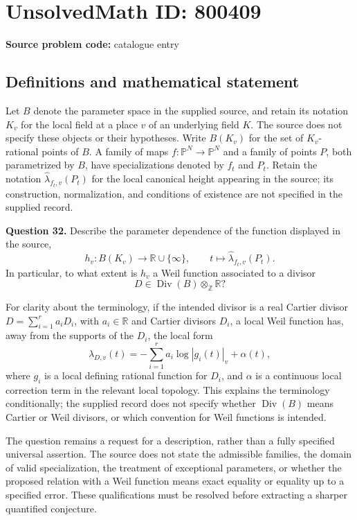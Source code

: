 \documentclass[11pt]{article}
\newcommand{\Z}{\mathbb{Z}}
\newcommand{\R}{\mathbb{R}}
\newcommand{\PP}{\mathbb{P}}
\begin{document}
\section*{UnsolvedMath ID: 800409}
\textbf{Source problem code:} catalogue entry
\subsection{Definitions and mathematical statement}
Let \(B\) denote the parameter space in the supplied source, and retain its notation \(K_v\) for the local field at a place \(v\) of an underlying field \(K\). The source does not specify these objects or their hypotheses. Write \(B(K_v)\) for the set of \(K_v\)-rational points of \(B\). A family of maps \(f\colon\PP^N\to\PP^N\) and a family of points \(P\), both parametrized by \(B\), have specializations denoted by \(f_t\) and \(P_t\). Retain the notation \(\hat\lambda_{f_t,v}(P_t)\) for the local canonical height appearing in the source; its construction, normalization, and conditions of existence are not specified in the supplied record.

\textbf{Question 32.} Describe the parameter dependence of the function displayed in the source,
\[
 h_v\colon B(K_v)\longrightarrow\R\cup\{\infty\},
 \qquad t\longmapsto\hat\lambda_{f_t,v}(P_t).
\]
In particular, to what extent is \(h_v\) a Weil function associated to a divisor
\[
 D\in\operatorname{Div}(B)\otimes_{\Z}\R?
\]

For clarity about the terminology, if the intended divisor is a real Cartier divisor \(D=\sum_{i=1}^{r}a_iD_i\), with \(a_i\in\R\) and Cartier divisors \(D_i\), a local Weil function has, away from the supports of the \(D_i\), the local form
\[
 \lambda_{D,v}(t)=-\sum_{i=1}^{r}a_i\log|g_i(t)|_v+\alpha(t),
\]
where \(g_i\) is a local defining rational function for \(D_i\), and \(\alpha\) is a continuous local correction term in the relevant local topology. This explains the terminology conditionally; the supplied record does not specify whether \(\operatorname{Div}(B)\) means Cartier or Weil divisors, or which convention for Weil functions is intended.

The question remains a request for a description, rather than a fully specified universal assertion. The source does not state the admissible families, the domain of valid specialization, the treatment of exceptional parameters, or whether the proposed relation with a Weil function means exact equality or equality up to a specified error. These qualifications must be resolved before extracting a sharper quantified conjecture.
\end{document}
